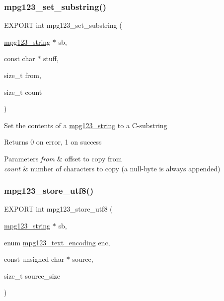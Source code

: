 \subsubsection{\texorpdfstring{mpg123\+\_\+set\+\_\+substring()}{mpg123\_set\_substring()}}
{\footnotesize\ttfamily E\+X\+P\+O\+RT int mpg123\+\_\+set\+\_\+substring (\begin{DoxyParamCaption}\item[{\hyperlink{structmpg123__string}{mpg123\+\_\+string} $\ast$}]{sb,  }\item[{const char $\ast$}]{stuff,  }\item[{size\+\_\+t}]{from,  }\item[{size\+\_\+t}]{count }\end{DoxyParamCaption})}

Set the contents of a \hyperlink{structmpg123__string}{mpg123\+\_\+string} to a C-\/substring \begin{DoxyReturn}{Returns}
0 on error, 1 on success 
\end{DoxyReturn}

\begin{DoxyParams}{Parameters}
{\em from} & offset to copy from \\
\hline
{\em count} & number of characters to copy (a null-\/byte is always appended) \\
\hline
\end{DoxyParams}
\mbox{\label{group__mpg123__metadata_gad4253518f7d56823d46ad365d272fa85}} 
\subsubsection{\texorpdfstring{mpg123\+\_\+store\+\_\+utf8()}{mpg123\_store\_utf8()}}
{\footnotesize\ttfamily E\+X\+P\+O\+RT int mpg123\+\_\+store\+\_\+utf8 (\begin{DoxyParamCaption}\item[{\hyperlink{structmpg123__string}{mpg123\+\_\+string} $\ast$}]{sb,  }\item[{enum \hyperlink{group__mpg123__metadata_ga489b4cd5fb8d1d826e38b09bed9294ce}{mpg123\+\_\+text\+\_\+encoding}}]{enc,  }\item[{const unsigned char $\ast$}]{source,  }\item[{size\+\_\+t}]{source\+\_\+size }\end{DoxyParamCaption})}

